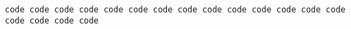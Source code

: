 \documentclass{article}
\begin{document}
\begin{verbatim}

code code code code code code code code code code code code code code code code code code

\end{verbatim}
\end{document}
